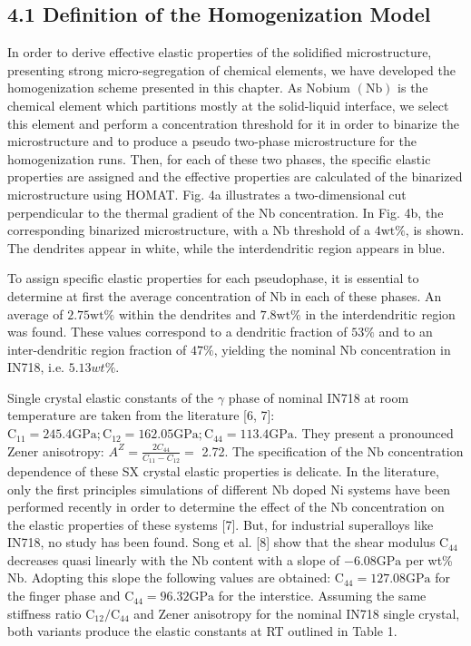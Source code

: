 \documentclass[10pt]{article}
\begin{document}
\subsection*{4.1 Definition of the Homogenization Model}
In order to derive effective elastic properties of the solidified microstructure, presenting strong micro-segregation of chemical elements, we have developed the homogenization scheme presented in this chapter. As Nobium $(\mathrm{Nb})$ is the chemical element which partitions mostly at the solid-liquid interface, we select this element and perform a concentration threshold for it in order to binarize the microstructure and to produce a pseudo two-phase microstructure for the homogenization runs. Then, for each of these two phases, the specific elastic properties are assigned and the effective properties are calculated of the binarized microstructure using HOMAT. Fig. 4a illustrates a two-dimensional cut perpendicular to the thermal gradient of the $\mathrm{Nb}$ concentration. In Fig. 4b, the corresponding binarized microstructure, with a $\mathrm{Nb}$ threshold of a $4 \mathrm{wt} \%$, is shown. The dendrites appear in white, while the interdendritic region appears in blue.

To assign specific elastic properties for each pseudophase, it is essential to determine at first the average concentration of $\mathrm{Nb}$ in each of these phases. An average of $2.75 \mathrm{wt} \%$ within the dendrites and $7.8 \mathrm{wt} \%$ in the interdendritic region was found. These values correspond to a dendritic fraction of $53 \%$ and to an inter-dendritic region fraction of $47 \%$, yielding the nominal $\mathrm{Nb}$ concentration in IN718, i.e. $5.13 w t \%$.

Single crystal elastic constants of the $\gamma$ phase of nominal IN718 at room temperature are taken from the literature [6, 7]: $\mathrm{C}_{11}=245.4 \mathrm{GPa} ; \mathrm{C}_{12}=162.05 \mathrm{GPa} ; \mathrm{C}_{44}=113.4 \mathrm{GPa}$. They present a pronounced Zener anisotropy: $A^{Z}=\frac{2 C_{44}}{C_{11}-C_{12}}=$ 2.72. The specification of the $\mathrm{Nb}$ concentration dependence of these SX crystal elastic properties is delicate. In the literature, only the first principles simulations of different $\mathrm{Nb}$ doped $\mathrm{Ni}$ systems have been performed recently in order to determine the effect of the $\mathrm{Nb}$ concentration on the elastic properties of these systems [7]. But, for industrial superalloys like IN718, no study has been found. Song et al. [8] show that the shear modulus $\mathrm{C}_{44}$ decreases quasi linearly with the $\mathrm{Nb}$ content with a slope of $-6.08 \mathrm{GPa}$ per wt\% $\mathrm{Nb}$. Adopting this slope the following values are obtained: $\mathrm{C}_{44}=127.08 \mathrm{GPa}$ for the finger phase and $\mathrm{C}_{44}=96.32 \mathrm{GPa}$ for the interstice. Assuming the same stiffness ratio $\mathrm{C}_{12} / \mathrm{C}_{44}$ and Zener anisotropy for the nominal IN718 single crystal, both variants produce the elastic constants at RT outlined in Table 1.
\end{document}
